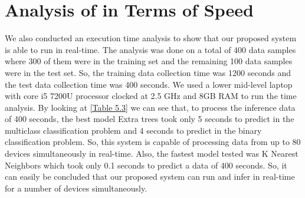 \section{Analysis of in Terms of Speed}
We also conducted an execution time analysis to show that our proposed system is able to run in real-time. The analysis was done on a total of 400 data samples where 300 of them were in the training set and the remaining 100 data samples were in the test set. So, the training data collection time was 1200 seconds and the test data collection time was 400 seconds. We used a lower mid-level laptop with core i5 7200U processor clocked at 2.5 GHz and 8GB RAM to run the time analysis. By looking at \ref{Table 5.3} we can see that, to process the inference data of 400 seconds, the best model Extra trees took only 5 seconds to predict in the multiclass classification problem and 4 seconds to predict in the binary classification problem. So, this system is capable of processing data from up to 80 devices simultaneously  in real-time. Also, the fastest model tested was K Nearest Neighbors which took only 0.1 seconds to predict a data of 400 seconds. So, it can easily be concluded that our proposed system can run and infer in real-time for a number of devices simultaneously.

